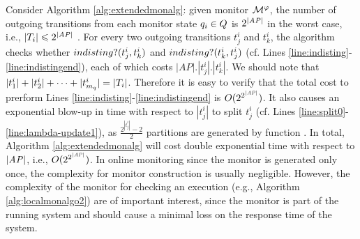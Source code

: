 Consider Algorithm \ref{alg:extendedmonalg}: given \LTLtri monitor $\mathcal{M}^\varphi$, the number of outgoing transitions from each monitor state $q_i \in Q$ is $2^{|\mathit{AP}|}$ in the worst case, i.e., $|T_i| \leqslant 2^{|\mathit{AP}|}$ . For every two outgoing transitions $t_j^i$ and $t_k^i$, the algorithm checks whether $indisting?(t_j^i, t_k^i)$ and $indisting?(t_k^i, t_j^i)$ (cf. Lines \ref{line:indisting}-\ref{line:indistingend}), each of which costs $|AP|.|t_j^i|.|t_k^i|$. We should note that $|t_1^i| + |t_2^i| + \cdots + |t_{m_q}^i| = |T_i|$. Therefore it is easy to verify that the total cost to prerform Lines \ref{line:indisting}-\ref{line:indistingend} is $O(2^{2^{|\mathit{AP}|}})$. It also causes an exponential blow-up in time with respect to $|t_j^i|$ to split $t_j^i$ (cf. Lines \ref{line:split0}-\ref{line:lambda-update1}), as $\frac{2^{| t_j^i|}-2}{2}$ partitions are generated by function \partition. In total, Algorithm \ref{alg:extendedmonalg} will cost double exponential time with respect to $|\mathit{AP}|$, i.e., $O(2^{2^{|\mathit{AP}|}})$. In online monitoring since the monitor is generated only once, the complexity for monitor construction is usually negligible. However, the complexity of the monitor for checking an execution (e.g., Algorithm \ref{alg:localmonalgo2}) are of important interest, since the monitor is part of the running system and should cause a minimal loss on the response time of the system.

\fi




